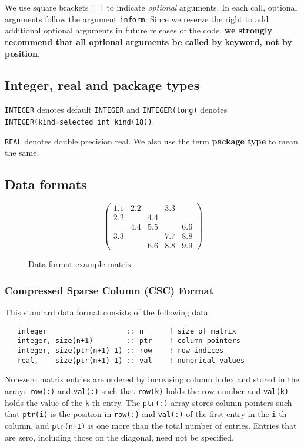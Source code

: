 We use square brackets {\tt [ ]} to indicate {\it optional} arguments.
In each
call, optional arguments follow the argument {\tt inform}.  Since we
reserve the right to add additional optional arguments in future
releases of the code, {\bf we strongly recommend that all optional
arguments be called by keyword, not by position}.

\subsection{Integer, real and package types}

{\tt INTEGER} denotes default {\tt INTEGER} and
{\tt INTEGER(long)} denotes {\tt INTEGER(kind=selected\_int\_kind(18))}.

\noindent
{\tt REAL} denotes double precision real.
We also use the term {\bf package type} to mean the same.

\subsection{Data formats} \label{ssids:dataformats}

\begin{figure}
   \caption{ \label{ssids:format eg}
      Data format example matrix
   }
   $$
      \left( \begin{array}{ccccc}
         1.1 & 2.2 &     & 3.3 &     \\
         2.2 &     & 4.4 &     &     \\
             & 4.4 & 5.5 &     & 6.6 \\
         3.3 &     &     & 7.7 & 8.8 \\
             &     & 6.6 & 8.8 & 9.9
      \end{array} \right)
   $$
\end{figure}

\subsubsection{Compressed Sparse Column (CSC) Format} \label{ssids:cscformat}
This standard data format consists of the following data:
\begin{verbatim}
   integer                   :: n      ! size of matrix
   integer, size(n+1)        :: ptr    ! column pointers
   integer, size(ptr(n+1)-1) :: row    ! row indices
   real,    size(ptr(n+1)-1) :: val    ! numerical values
\end{verbatim}
Non-zero matrix entries are ordered by increasing column index and stored in
the arrays \texttt{row(:)} and \texttt{val(:)} such that \texttt{row(k)} holds
the row number and \texttt{val(k)} holds the value of the \texttt{k}-th entry.
The \texttt{ptr(:)} array stores column pointers such that \texttt{ptr(i)} is
the position in \texttt{row(:)} and \texttt{val(:)} of
the first entry in the \texttt{i}-th column, and \texttt{ptr(n+1)} is one more
than the total number of entries.
Entries that are zero, including those on the diagonal, need not be specified.

